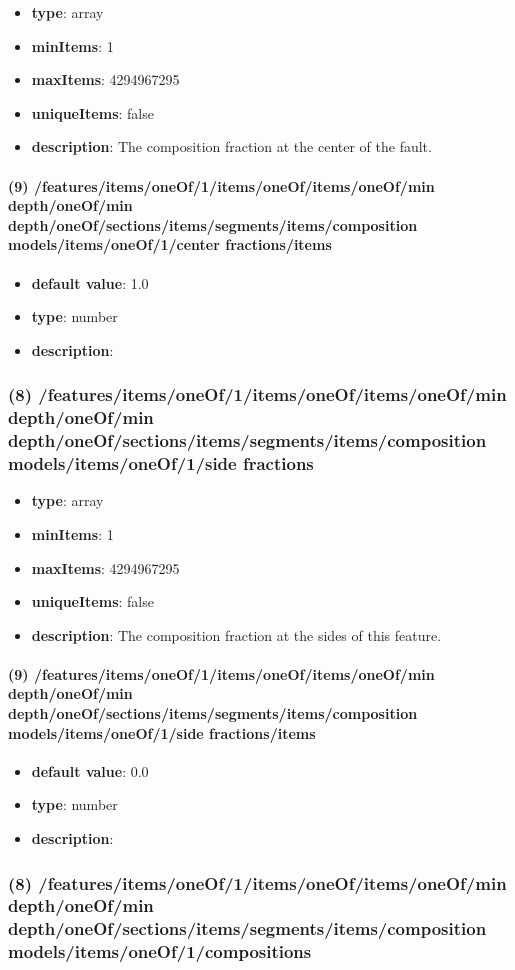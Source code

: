 \begin{itemize}[leftmargin=8em]\item {\bf type}: array
\item {\bf minItems}: 1
\item {\bf maxItems}: 4294967295
\item {\bf uniqueItems}: false
\item {\bf description}: The composition fraction at the center of the fault.
\end{itemize}\paragraph{(9) /features/items/oneOf/1/items/oneOf/items/oneOf/min depth/oneOf/min depth/oneOf/sections/items/segments/items/composition models/items/oneOf/1/center fractions/items}
\begin{itemize}[leftmargin=9em]\item {\bf default value}: 1.0
\item {\bf type}: number
\item {\bf description}: 
\end{itemize}\subsubsection{(8) /features/items/oneOf/1/items/oneOf/items/oneOf/min depth/oneOf/min depth/oneOf/sections/items/segments/items/composition models/items/oneOf/1/side fractions}
\begin{itemize}[leftmargin=8em]\item {\bf type}: array
\item {\bf minItems}: 1
\item {\bf maxItems}: 4294967295
\item {\bf uniqueItems}: false
\item {\bf description}: The composition fraction at the sides of this feature.
\end{itemize}\paragraph{(9) /features/items/oneOf/1/items/oneOf/items/oneOf/min depth/oneOf/min depth/oneOf/sections/items/segments/items/composition models/items/oneOf/1/side fractions/items}
\begin{itemize}[leftmargin=9em]\item {\bf default value}: 0.0
\item {\bf type}: number
\item {\bf description}: 
\end{itemize}\subsubsection{(8) /features/items/oneOf/1/items/oneOf/items/oneOf/min depth/oneOf/min depth/oneOf/sections/items/segments/items/composition models/items/oneOf/1/compositions}
